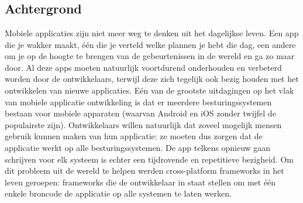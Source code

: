 
\chapter{}
\label{ch:inleiding}

%

\section{Achtergrond}
\label{sec:achtergrond}

Mobiele applicaties zijn niet meer weg te denken uit het dagelijkse leven. Een
app die je wakker maakt, één die je verteld welke plannen je hebt die dag, een
andere om je op de hoogte te brengen van de gebeurtenissen in de wereld en ga zo
maar door. Al deze apps moeten natuurlijk voortdurend onderhouden en verbeterd
worden door de ontwikkelaars, terwijl deze zich tegelijk ook bezig houden met
het ontwikkelen van nieuwe applicaties. Eén van de grootste uitdagingen op het
vlak van mobiele applicatie ontwikkeling is dat er meerdere besturingssystemen
bestaan voor mobiele apparaten (waarvan Android en iOS zonder twijfel de
populairste zijn). Ontwikkelaars willen natuurlijk dat zoveel mogelijk mensen
gebruik kunnen maken van hun applicatie: ze moeten dus zorgen dat de applicatie
werkt op alle besturingssystemen. De app telkens opnieuw gaan schrijven voor elk
systeem is echter een tijdrovende en repetitieve bezigheid. Om dit probleem uit
de wereld te helpen werden cross-platform frameworks in het leven geroepen:
frameworks die de ontwikkelaar in staat stellen om met één enkele broncode de
applicatie op alle systemen te laten werken.

